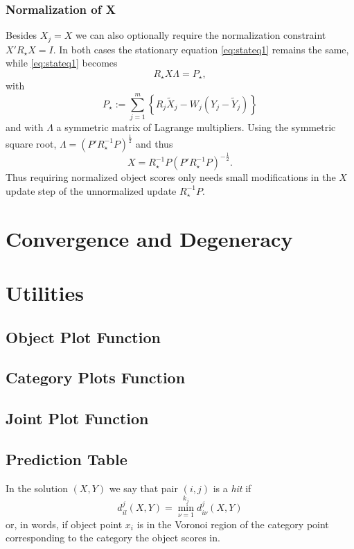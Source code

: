 \documentclass[
  12pt,
]{article}
\begin{document}
\subsubsection{Normalization of X}\label{normalization-of-x}

Besides \(X_j=X\) we can also optionally require the normalization constraint \(X'R_\star X=I\). In both cases the stationary equation \eqref{eq:stateq1} remains the same, while \eqref{eq:stateq1} becomes
\[
R_\star X\Lambda=P_\star,
\]
with
\[
P_\star:=\sum_{j=1}^m\left\{R_j\tilde X_j-W_j(Y_j-\tilde Y_j)\right\}
\]
and with \(\Lambda\) a symmetric matrix of Lagrange multipliers.
Using the symmetric square root, \(\Lambda=(P'R_\star^{-1}P)^\frac12\) and thus
\[
X=R_\star^{-1}P(P'R_\star^{-1}P)^{-\frac12}.
\]
Thus requiring normalized object scores only needs small modifications in the \(X\) update step of the unnormalized update \(R_\star^{-1}P\).

\section{Convergence and Degeneracy}\label{convergence-and-degeneracy}

\section{Utilities}\label{utilities}

\subsection{Object Plot Function}\label{object-plot-function}

\subsection{Category Plots Function}\label{category-plots-function}

\subsection{Joint Plot Function}\label{joint-plot-function}

\subsection{Prediction Table}\label{prediction-table}

In the solution \((X,Y)\) we say that pair \((i,j)\) is a \emph{hit} if
\[
d_{il}^j(X,Y)=\min_{\nu=1}^{k_j}d_{i\nu}^j(X,Y)
\]
or, in words, if object point \(x_i\) is in the Voronoi region of the category point
corresponding to the category the object scores in.
\end{document}
